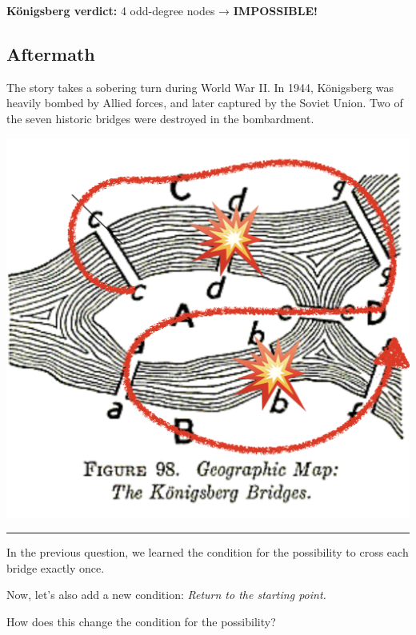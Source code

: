\documentclass[
  letterpaper,
  DIV=11,
  numbers=noendperiod,
  oneside]{scrartcl}
\begin{document}
\textbf{Königsberg verdict:} 4 odd-degree nodes → \textbf{IMPOSSIBLE!}

\subsection{Aftermath}\label{aftermath}

The story takes a sobering turn during World War II. In 1944, Königsberg
was heavily bombed by Allied forces, and later captured by the Soviet
Union. Two of the seven historic bridges were destroyed in the
bombardment.

\begin{center}
\includegraphics[width=1\linewidth,height=\textheight,keepaspectratio]{./seven-bridge-bombared.png}
\end{center}

\begin{center}\rule{0.5\linewidth}{0.5pt}\end{center}

\begin{tcolorbox}[enhanced jigsaw, opacityback=0, bottomtitle=1mm, toptitle=1mm, breakable, rightrule=.15mm, colbacktitle=quarto-callout-note-color!10!white, toprule=.15mm, coltitle=black, colback=white, titlerule=0mm, opacitybacktitle=0.6, title=\textcolor{quarto-callout-note-color}{\faInfo}\hspace{0.5em}{Question:}, arc=.35mm, leftrule=.75mm, bottomrule=.15mm, left=2mm, colframe=quarto-callout-note-color-frame]

In the previous question, we learned the condition for the possibility
to cross each bridge exactly once.

Now, let's also add a new condition: \emph{{Return to the starting
point}.}

How does this change the condition for the possibility?

\end{tcolorbox}
\end{document}
